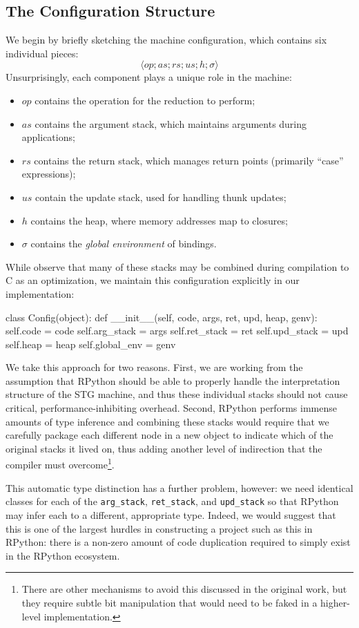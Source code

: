 \documentclass[preprint]{sigplanconf}
\begin{document}
\subsection{The Configuration Structure}
We begin by briefly sketching the machine configuration, which contains
six individual pieces:
\[\langle op; as; rs; us; h; \sigma\rangle\]
Unsurprisingly, each component plays a unique role in the machine:
\begin{itemize}
  \item $op$ contains the operation for the reduction to perform;
  \item $as$ contains the argument stack, which maintains arguments
        during applications;
  \item $rs$ contains the return stack, which manages return points
        (primarily ``case'' expressions);
  \item $us$ contain the update stack, used for handling thunk updates;
  \item $h$ contains the heap, where memory addresses map to closures;
  \item $\sigma$ contains the \emph{global environment} of bindings.
\end{itemize}
While \citet{spj:stgmachine} observe that many of these stacks may
be combined during compilation to C as an optimization, we maintain
this configuration explicitly in our implementation:
\begin{code}
class Config(object):
  def __init__(self, code, args, ret,  
                     upd, heap, genv):
    self.code       = code
    self.arg_stack  = args
    self.ret_stack  = ret
    self.upd_stack  = upd
    self.heap       = heap
    self.global_env = genv
\end{code}
We take this approach for two reasons. First, we are working from the
assumption that RPython should be able to properly handle the interpretation
structure of the STG machine, and thus these individual stacks should not
cause critical, performance-inhibiting overhead.
Second, RPython performs immense amounts of type inference and combining
these stacks would require that we carefully package each different node
in a new object to indicate which of the original stacks it lived on,
thus adding another level of indirection that the compiler must 
overcome\footnote{There are other mechanisms to avoid this discussed
in the original work, but they require subtle bit manipulation that
would need to be faked in a higher-level implementation.}. 

This automatic type distinction has a further problem, however: we need
identical classes for each of the \lstinline{arg_stack}, \lstinline{ret_stack},
and \lstinline{upd_stack} so that RPython may infer each to a different,
appropriate type. Indeed, we would suggest that this is one of the largest
hurdles in constructing a project such as this in RPython: there is a non-zero
amount of code duplication required to simply exist in the RPython ecosystem.
\end{document}

